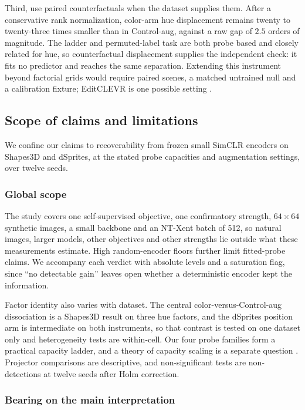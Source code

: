 \documentclass[10pt]{article}
\begin{document}
Third, use paired counterfactuals when the dataset supplies them. After a conservative rank
normalization, color-arm hue displacement remains twenty to twenty-three times smaller than in
Control-aug, against a raw gap of $2.5$ orders of magnitude. The ladder and permuted-label task are
both probe based and closely related for hue, so counterfactual displacement supplies the independent
check: it fits no predictor and reaches the same separation. Extending this instrument beyond
factorial grids would require paired scenes, a matched untrained null and a calibration fixture;
EditCLEVR is one possible setting \citep{karnam2026editclevr}.

\subsection{Scope of claims and limitations}
\label{sec:limitations}
We confine our claims to recoverability from frozen small SimCLR encoders on Shapes3D and dSprites,
at the stated probe capacities and augmentation settings, over twelve seeds.

\subsubsection*{Global scope}
The study covers one self-supervised objective, one confirmatory strength, $64\times64$ synthetic
images, a small backbone and an NT-Xent batch of 512, so natural images, larger models, other
objectives and other strengths lie outside what these measurements estimate. High
random-encoder floors further limit fitted-probe claims. We accompany each verdict with absolute
levels and a saturation flag, since ``no detectable gain'' leaves open whether a deterministic
encoder kept the information.

Factor identity also varies with dataset. The central color-versus-Control-aug dissociation is a
Shapes3D result on three hue factors, and the dSprites position arm is intermediate on both
instruments, so that contrast is tested on one dataset only and heterogeneity tests are within-cell.
Our four probe families form a practical capacity ladder, and a theory of capacity scaling is a
separate question \citep{lee2026shallow}. Projector comparisons are descriptive, and
non-significant tests are non-detections at twelve seeds after Holm correction.

\subsubsection*{Bearing on the main interpretation}
\end{document}
